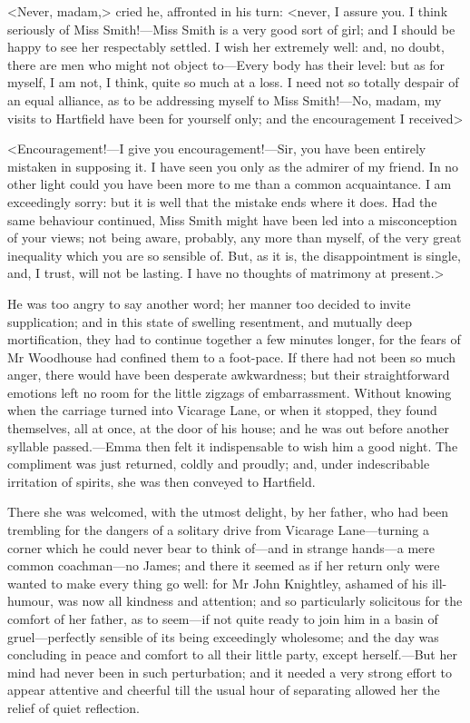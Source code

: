 <Never, madam,> cried he, affronted in his turn: <never, I assure you. I think seriously of Miss Smith!—Miss Smith is a very good sort of girl; and I should be happy to see her respectably settled. I wish her extremely well: and, no doubt, there are men who might not object to—Every body has their level: but as for myself, I am not, I think, quite so much at a loss. I need not so totally despair of an equal alliance, as to be addressing myself to Miss Smith!—No, madam, my visits to Hartfield have been for yourself only; and the encouragement I received\longdash>

<Encouragement!—I give you encouragement!—Sir, you have been entirely mistaken in supposing it. I have seen you only as the admirer of my friend. In no other light could you have been more to me than a common acquaintance. I am exceedingly sorry: but it is well that the mistake ends where it does. Had the same behaviour continued, Miss Smith might have been led into a misconception of your views; not being aware, probably, any more than myself, of the very great inequality which you are so sensible of. But, as it is, the disappointment is single, and, I trust, will not be lasting. I have no thoughts of matrimony at present.>

He was too angry to say another word; her manner too decided to invite supplication; and in this state of swelling resentment, and mutually deep mortification, they had to continue together a few minutes longer, for the fears of Mr Woodhouse had confined them to a foot-pace. If there had not been so much anger, there would have been desperate awkwardness; but their straightforward emotions left no room for the little zigzags of embarrassment. Without knowing when the carriage turned into Vicarage Lane, or when it stopped, they found themselves, all at once, at the door of his house; and he was out before another syllable passed.—Emma then felt it indispensable to wish him a good night. The compliment was just returned, coldly and proudly; and, under indescribable irritation of spirits, she was then conveyed to Hartfield.

There she was welcomed, with the utmost delight, by her father, who had been trembling for the dangers of a solitary drive from Vicarage Lane—turning a corner which he could never bear to think of—and in strange hands—a mere common coachman—no James; and there it seemed as if her return only were wanted to make every thing go well: for Mr John Knightley, ashamed of his ill-humour, was now all kindness and attention; and so particularly solicitous for the comfort of her father, as to seem—if not quite ready to join him in a basin of gruel—perfectly sensible of its being exceedingly wholesome; and the day was concluding in peace and comfort to all their little party, except herself.—But her mind had never been in such perturbation; and it needed a very strong effort to appear attentive and cheerful till the usual hour of separating allowed her the relief of quiet reflection.